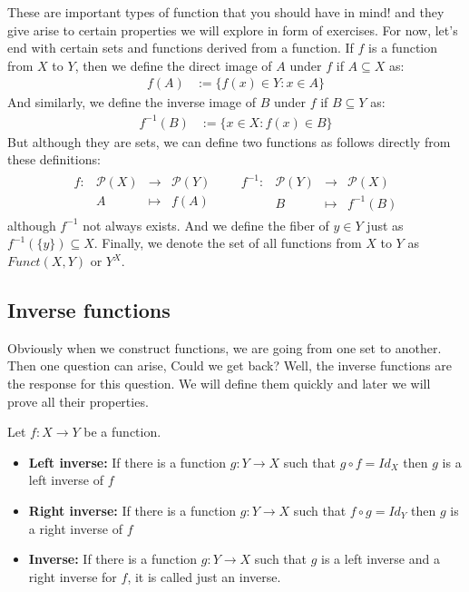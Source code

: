 \documentclass{tufte-handout}
\begin{document}
These are important types of function that you should have in mind! and they give arise to certain properties we will explore in form of exercises. For now, let's end with certain sets and functions derived from a function. If $f$ is a function from $X$ to $Y$, then we define the direct image of $A$ under $f$ if $A \subseteq X$ as:
\begin{align*}
	f(A) &:= \{f(x) \in Y: x \in A\}
\end{align*}
And similarly, we define the inverse image of $B$ under $f$ if $B \subseteq Y$ as:
\begin{align*}
	f^{-1}(B) &:= \{x \in X: f(x) \in B\}
\end{align*}
But although they are sets, we can define two functions as follows directly from these definitions:
\begin{align*}
	\begin{matrix}
		f: &\mathcal{P}(X)& \to &\mathcal{P}(Y)\\
		&A &\mapsto &f(A)
	\end{matrix} && \begin{matrix}
		f^{-1}: &\mathcal{P}(Y)& \to &\mathcal{P}(X)\\
		&B&\mapsto&f^{-1}(B)
	\end{matrix}
\end{align*}
although $f^{-1}$ not always exists. And we define the fiber of $y \in Y$ just as $f^{-1}(\{y\}) \subseteq X$. Finally, we denote the set of all functions from $X$ to $Y$ as $Funct(X, Y)$ or $Y^X$.\\

\subsection{Inverse functions}
Obviously when we construct functions, we are going from one set to another. Then one question can arise, Could we get back? Well, the inverse functions are the response for this question. We will define them quickly and later we will prove all their properties.

\begin{definition}
	Let $f: X \to Y$ be a function.
	\begin{itemize}
		\item \textbf{Left inverse:} If there is a function $g: Y \to X$ such that $g \circ f = Id_X$ then $g$ is a left inverse of $f$
		\item \textbf{Right inverse:} If there is a function $g: Y \to X$ such that $f \circ g = Id_Y$ then $g$ is a right inverse of $f$
		\item \textbf{Inverse:} If there is a function $g: Y \to X$ such that $g$ is a left inverse and a right inverse for $f$, it is called just an inverse.
	\end{itemize}
\end{definition}
\end{document}
